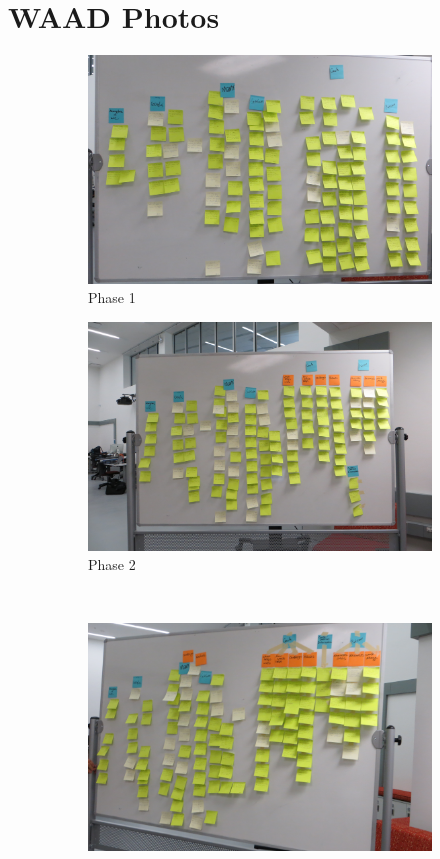 \documentclass[12pt]{article} %
\begin{document}
\section{WAAD Photos}

\begin{figure}[H]
\begin{subfigure}{.5\linewidth}
\centering
\includegraphics[width=0.95\linewidth]{WAAD_version1}
\caption{Phase 1}
\label{fig:WAAD_version1}
\end{subfigure}%
\begin{subfigure}{.5\linewidth}
\centering
\includegraphics[width=0.95\linewidth]{WAAD_version2}
\caption{Phase 2}
\label{fig:WAAD_version2}
\end{subfigure}\\[1ex]
\begin{subfigure}{.5\linewidth}
\centering
\includegraphics[width=0.95\linewidth]{WAAD_version3}

\end{subfigure}
\end{figure}
\end{document}
